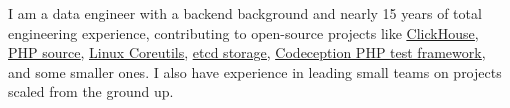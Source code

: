 I am a data engineer with a backend background and nearly 15 years of total
engineering experience, contributing to open-source projects like
\href{https://github.com/ClickHouse/ClickHouse/pulls?q=is\%3Apr+is\%3Aclosed+author\%3AGSokol}{\underline{ClickHouse}},
\href{https://github.com/php/php-src/pulls?q=is\%3Apr+is\%3Aclosed+author\%3AGSokol}{\underline{PHP source}},
\href{https://github.com/coreutils/coreutils/commits?author=GSokol}{\underline{Linux Coreutils}},
\href{https://github.com/etcd-io/etcd/pulls?q=is\%3Apr+is\%3Aclosed+author\%3AGSokol}{\underline{etcd storage}},
\href{https://github.com/Codeception/Codeception/pulls?q=is\%3Apr+is\%3Aclosed+author\%3AGSokol}{\underline{Codeception PHP test framework}},
and some smaller ones. I also have experience in leading small teams on
projects scaled from the ground up.


